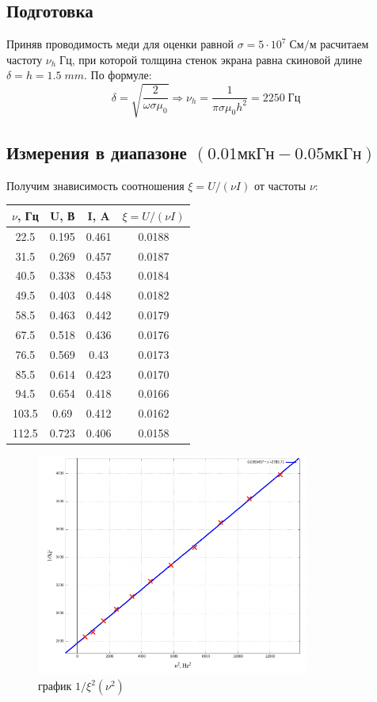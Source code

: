 \documentclass[11pt]{article}
\begin{document}
\subsection{Подготовка}
Приняв проводимость меди для оценки равной \( \sigma = 5\cdot 10^{7}\; См/м \) расчитаем частоту \( \nu_h\; Гц \),
при которой толщина стенок экрана равна скиновой длине \( \delta = h = 1.5\; mm \). По формуле:
\[ \delta = \sqrt{\frac{2}{\omega \sigma \mu_0}} \Rightarrow \nu_h = \frac{1}{\pi\sigma\mu_0 h^2} = 2250\; Гц \]
\subsection{Измерения в диапазоне \((0.01мкГн - 0.05мкГн)\)}
Получим знависимость соотношения \( \xi = U/(\nu I) \) от частоты \(\nu\):
\begin{table}[H]
    \centering
    \begin{tabular}{|c|c|c|c|}
    \hline
    \(\nu\), Гц & U, В  & I, A  & \(\xi = U/(\nu I)\) \\\hline
    22.5 & 0.195 & 0.461 & 0.0188   \\\hline
    31.5 & 0.269 & 0.457 & 0.0187   \\\hline
    40.5 & 0.338 & 0.453 & 0.0184   \\\hline
    49.5 & 0.403 & 0.448 & 0.0182   \\\hline
    58.5 & 0.463 & 0.442 & 0.0179   \\\hline
    67.5 & 0.518 & 0.436 & 0.0176   \\\hline
    76.5 & 0.569 & 0.43  & 0.0173   \\\hline
    85.5 & 0.614 & 0.423 & 0.0170   \\\hline
    94.5 & 0.654 & 0.418 & 0.0166   \\\hline
    103.5& 0.69  & 0.412 & 0.0162   \\\hline
    112.5& 0.723 & 0.406 & 0.0158   \\\hline
    \end{tabular}
\end{table}

\begin{figure}[H]
    \centering
    \includegraphics[width=0.8\textwidth]{1.png}
    \caption{график \( 1/\xi^2(\nu^2) \)}
    \label{plot1}
\end{figure}
\end{document}
